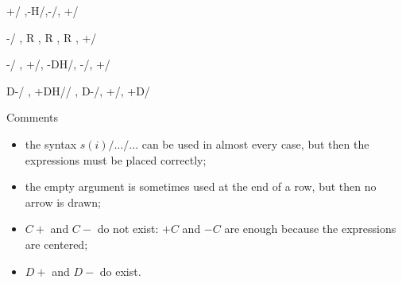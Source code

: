 \begin{minipage}{16cm}
\begin{tkzexample}
 {+/  \va  ,-H/\vb,-/\vc, +/  \vd}
\end{tkzexample}
\end{minipage}

\begin{minipage}{16cm}
\begin{tkzexample}
 {-/  \va  , R , R , R , +/  \ve}
\end{tkzexample}
\end{minipage}

\begin{minipage}{16cm}
\begin{tkzexample}
  {-/ \va , +/\vb , -DH/\vc , -/\vd , +/ \ve}
 \end{tkzexample}
\end{minipage}

\begin{minipage}{16cm}
\begin{tkzexample}
 {D-/ \va , +DH/\vb/ , D-/\vc , +/\vd , +D/\ve}
\end{tkzexample}
\end{minipage}
\egroup

\medskip
Comments
\begin{itemize}
  \item the syntax $s(i)/\ldots/\ldots$ can be used in almost every case, but then the expressions must be placed correctly;

  \item the empty argument is sometimes used at the end of a row, but then no arrow is drawn;

  \item $C+$ and $C-$ do not exist: $+C$ and $-C$ are enough because the expressions are centered;
  \item $D+$ and $D-$ do exist.

\end{itemize}


